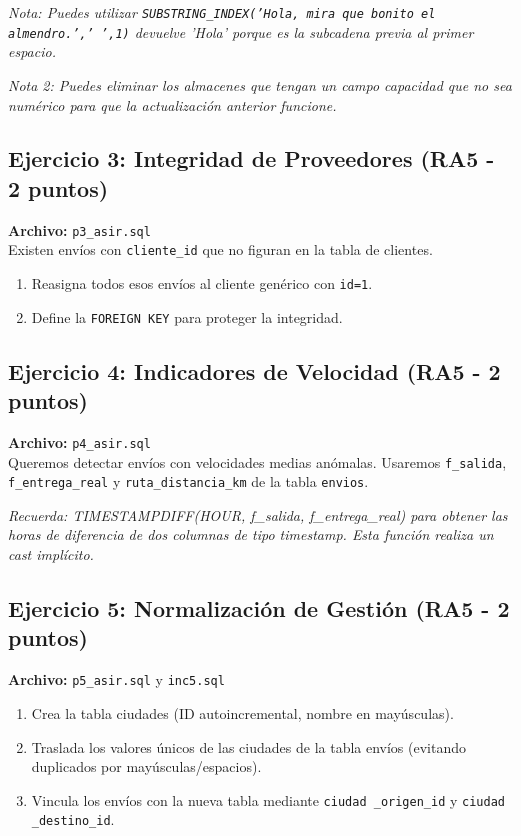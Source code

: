 \documentclass[12pt,a4paper]{article}
\begin{document}
\textit{Nota: Puedes utilizar \texttt{SUBSTRING\_INDEX('Hola, mira que bonito el almendro.',' ',1)} devuelve 'Hola' porque es la subcadena previa al primer espacio.}

\textit{Nota 2: Puedes eliminar los almacenes que tengan un campo capacidad que no sea numérico para que la actualización anterior funcione.}

\subsection{Ejercicio 3: Integridad de Proveedores \textcolor{RA5}{(RA5 - 2 puntos)}}
\textbf{Archivo:} \texttt{p3\_asir.sql} \\
Existen envíos con \texttt{cliente\_id} que no figuran en la tabla de clientes.
\begin{enumerate}
    \item Reasigna todos esos envíos al cliente genérico con \texttt{id=1}.
    \item Define la \texttt{FOREIGN KEY} para proteger la integridad.
\end{enumerate}

\subsection{Ejercicio 4: Indicadores de Velocidad  \textcolor{RA5}{(RA5 - 2 puntos)}}
\textbf{Archivo:} \texttt{p4\_asir.sql} \\
Queremos detectar envíos con velocidades medias anómalas. Usaremos \texttt{f\_salida}, \texttt{f\_entrega\_real} y \texttt{ruta\_distancia\_km} de la tabla \texttt{envios}.

\textit{Recuerda: TIMESTAMPDIFF(HOUR, f\_salida, f\_entrega\_real) para obtener las horas de diferencia de dos columnas de tipo timestamp. Esta función realiza un cast implícito.}

\subsection{Ejercicio 5: Normalización de Gestión \textcolor{RA5}{(RA5 - 2 puntos)}}
\textbf{Archivo:} \texttt{p5\_asir.sql} y \texttt{inc5.sql} \\
\begin{enumerate}
    \item Crea la tabla ciudades (ID autoincremental, nombre en mayúsculas).
    \item Traslada los valores únicos de las ciudades de la tabla envíos (evitando duplicados por mayúsculas/espacios).
    \item Vincula los envíos con la nueva tabla mediante \texttt{ciudad \_origen\_id} y \texttt{ciudad \_destino\_id}.
\end{enumerate}
\end{document}
